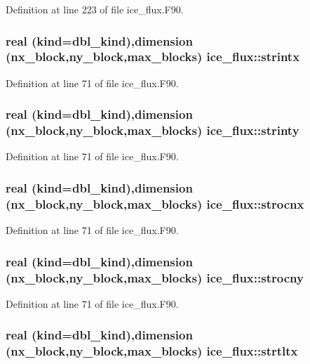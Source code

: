 Definition at line 223 of file ice\_\-flux.F90.\hypertarget{namespaceice__flux_aff350f7a31d4c9cc9429ef1a14d1c91f}{
\subsubsection[{strintx}]{\setlength{\rightskip}{0pt plus 5cm}real (kind=dbl\_\-kind),dimension (nx\_\-block,ny\_\-block,max\_\-blocks) {\bf ice\_\-flux::strintx}}}
\label{namespaceice__flux_aff350f7a31d4c9cc9429ef1a14d1c91f}


Definition at line 71 of file ice\_\-flux.F90.\hypertarget{namespaceice__flux_a8bfac55007c715a028b0ac9b8e9daed5}{
\subsubsection[{strinty}]{\setlength{\rightskip}{0pt plus 5cm}real (kind=dbl\_\-kind),dimension (nx\_\-block,ny\_\-block,max\_\-blocks) {\bf ice\_\-flux::strinty}}}
\label{namespaceice__flux_a8bfac55007c715a028b0ac9b8e9daed5}


Definition at line 71 of file ice\_\-flux.F90.\hypertarget{namespaceice__flux_a3302aaf2e5a99949808d98b685228ecf}{
\subsubsection[{strocnx}]{\setlength{\rightskip}{0pt plus 5cm}real (kind=dbl\_\-kind),dimension (nx\_\-block,ny\_\-block,max\_\-blocks) {\bf ice\_\-flux::strocnx}}}
\label{namespaceice__flux_a3302aaf2e5a99949808d98b685228ecf}


Definition at line 71 of file ice\_\-flux.F90.\hypertarget{namespaceice__flux_a0e146ebf56010398ef99ba1539dbc1ce}{
\subsubsection[{strocny}]{\setlength{\rightskip}{0pt plus 5cm}real (kind=dbl\_\-kind),dimension (nx\_\-block,ny\_\-block,max\_\-blocks) {\bf ice\_\-flux::strocny}}}
\label{namespaceice__flux_a0e146ebf56010398ef99ba1539dbc1ce}


Definition at line 71 of file ice\_\-flux.F90.\hypertarget{namespaceice__flux_a1380a09740e78ddbcc3abe4edc2b3e2f}{
\subsubsection[{strtltx}]{\setlength{\rightskip}{0pt plus 5cm}real (kind=dbl\_\-kind),dimension (nx\_\-block,ny\_\-block,max\_\-blocks) {\bf ice\_\-flux::strtltx}}}
\label{namespaceice__flux_a1380a09740e78ddbcc3abe4edc2b3e2f}


